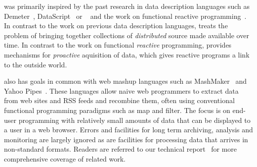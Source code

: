 
\padsd{} was primarily inspired by the past research in 
data description languages such as Demeter~\cite{lieberherr:demeter}, 
DataScript~\cite{gpce02} or
\pads{}~\cite{fisher+:pads,mandelbaum+:pads-ml} and the work on functional reactive 
programming~\cite{elliot+:frp}.  In contrast to the work on previous
data description languages, \padsd{} treats the problem of bringing together
collections of {\em distributed} source made available over time.  In
contrast to the work on functional {\em reactive} programming, \padsd{}
provides mechanisms for {\em proactive} aquisition of data, which gives
reactive programs a link to the outside world.

\padsd{} also has goals in common with 
web mashup languages such as MashMaker~\cite{ennals+:mashmaker} 
and Yahoo Pipes~\cite{yahoopipes}.  These languages allow naive web 
programmers to extract data from web sites and RSS feeds and recombine them,
often using conventional functional programming paradigms such as
map and filter.  The focus is on end-user programming with relatively
small amounts of data that can be displayed to a user in a web
browser. Errors and facilities for long term archiving, analysis and monitoring
are largely ignored as are facilities for processing data that arrives
in non-standard formats. Readers are referred to our technical report~\cite{zhu+:padsdtr}
for more comprehensive coverage of related work.
%


